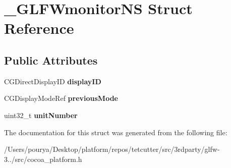 \hypertarget{struct__GLFWmonitorNS}{}\section{\+\_\+\+G\+L\+F\+Wmonitor\+N\+S Struct Reference}
\label{struct__GLFWmonitorNS}
\subsection*{Public Attributes}
\begin{DoxyCompactItemize}
\item 
\hypertarget{struct__GLFWmonitorNS_abe7227de7971669512a8448962927652}{}C\+G\+Direct\+Display\+I\+D {\bfseries display\+I\+D}\label{struct__GLFWmonitorNS_abe7227de7971669512a8448962927652}

\item 
\hypertarget{struct__GLFWmonitorNS_af7a340549b552ac7715eecc374e8de88}{}C\+G\+Display\+Mode\+Ref {\bfseries previous\+Mode}\label{struct__GLFWmonitorNS_af7a340549b552ac7715eecc374e8de88}

\item 
\hypertarget{struct__GLFWmonitorNS_a0d57aadff800a614e0ea769b3b3c99d3}{}uint32\+\_\+t {\bfseries unit\+Number}\label{struct__GLFWmonitorNS_a0d57aadff800a614e0ea769b3b3c99d3}

\end{DoxyCompactItemize}


The documentation for this struct was generated from the following file\+:\begin{DoxyCompactItemize}
\item 
/\+Users/pourya/\+Desktop/platform/repos/tetcutter/src/3rdparty/glfw-\/3../src/cocoa\+\_\+platform.\+h\end{DoxyCompactItemize}

